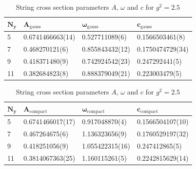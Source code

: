 \begin{table}[!hb]
\centering
\begin{tabular}{llll}
    $\mathbf{N_y}$ & $\mathbf{A_\mathrm{gauss}}$ & $\mathbf{\omega_\mathrm{gauss}}$ & $\mathbf{c_\mathrm{gauss}}$ \\ \hline
   5 & 0.6741466663(14) & 0.527711089(6) & 0.1566503461(8) \\
   7 & 0.468270121(6) & 0.855843432(12) & 0.1750474729(34) \\
   9 & 0.418371480(9) & 0.742924542(23) & 0.247292441(5) \\
   11 & 0.382684823(8) & 0.888379049(21) & 0.223003479(5) \\
\end{tabular}
\begin{tabular}{llll}
    $\mathbf{N_y}$ & $\mathbf{A_\mathrm{compact}}$ & $\mathbf{\omega_\mathrm{compact}}$ & $\mathbf{c_\mathrm{compact}}$ \\ \hline
   5 & 0.6741466017(17) & 0.917048870(4) & 0.1566504107(10) \\
   7 & 0.467264675(6) & 1.136323656(9) & 0.1760529197(32) \\
   9 & 0.418251056(9) & 1.055422315(16) & 0.247412865(5) \\
   11 & 0.3814067363(25) & 1.160115261(5) & 0.2242815629(14) \\
\end{tabular}
\caption{String cross section parameters $A$, $\omega$ and $c$ for $g^2=2.5$}
\end{table}
